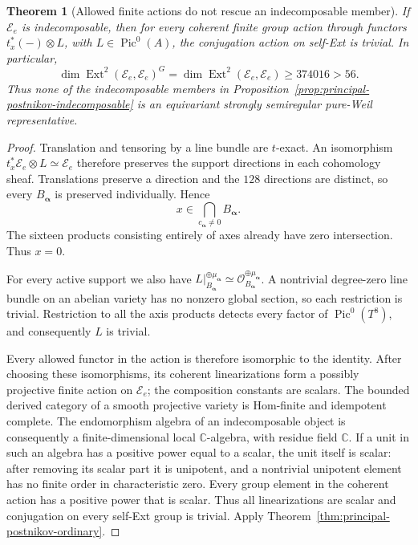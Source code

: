 \documentclass[11pt]{article}
\newtheorem{theorem}{Theorem}[section]
\theoremstyle{definition}
\theoremstyle{remark}
\begin{document}
\begin{theorem}[Allowed finite actions do not rescue an indecomposable member]
\label{thm:principal-postnikov-equivariant}
If $\mathcal E_e$ is indecomposable, then for every coherent finite
group action through functors $t_x^*(-)\otimes L$, with
$L\in\operatorname{Pic}^0(A)$, the conjugation action on
self-Ext is trivial.  In particular,
\[
 \dim\operatorname{Ext}^2(\mathcal E_e,\mathcal E_e)^G
 =\dim\operatorname{Ext}^2(\mathcal E_e,\mathcal E_e)
 \geq374016>56.
\]
Thus none of the indecomposable members in
Proposition~\ref{prop:principal-postnikov-indecomposable} is an
equivariant strongly semiregular pure-Weil representative.
\end{theorem}

\begin{proof}
Translation and tensoring by a line bundle are $t$-exact.
An isomorphism $t_x^*\mathcal E_e\otimes L\simeq\mathcal E_e$
therefore preserves the support directions in each cohomology
sheaf.  Translations preserve a direction and the $128$ directions
are distinct, so every $B_{\boldsymbol\alpha}$ is preserved
individually.  Hence
\[
 x\in\bigcap_{c_{\boldsymbol\alpha}\ne0}B_{\boldsymbol\alpha}.
\]
The sixteen products consisting entirely of axes already have
zero intersection.  Thus $x=0$.

For every active support we also have
$L|_{B_{\boldsymbol\alpha}}^{\oplus\mu_{\boldsymbol\alpha}}
\simeq\mathcal O_{B_{\boldsymbol\alpha}}^{\oplus\mu_{\boldsymbol\alpha}}$.
A nontrivial degree-zero line bundle on an abelian variety has no
nonzero global section, so each restriction is trivial.
Restriction to all the axis products detects every factor of
$\operatorname{Pic}^0(T^8)$, and consequently $L$ is trivial.

Every allowed functor in the action is therefore isomorphic to
the identity.  After choosing these isomorphisms, its coherent
linearizations form a possibly projective finite action on
$\mathcal E_e$; the composition constants are scalars.
The bounded derived category of a smooth projective variety is
Hom-finite and idempotent complete.  The endomorphism algebra of
an indecomposable object is consequently a finite-dimensional
local $\mathbb C$-algebra, with residue field $\mathbb C$.
If a unit in such an algebra has a positive power equal to a
scalar, the unit itself is scalar: after removing its scalar
part it is unipotent, and a nontrivial unipotent element has no
finite order in characteristic zero.  Every group element in the
coherent action has a positive power that is scalar.  Thus all
linearizations are scalar and conjugation on every self-Ext
group is trivial.  Apply
Theorem~\ref{thm:principal-postnikov-ordinary}.
\end{proof}
\end{document}
